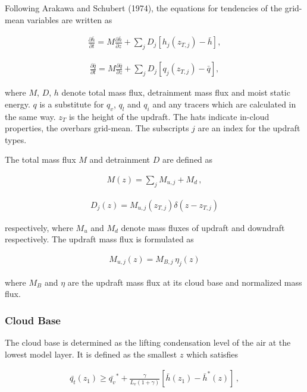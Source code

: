 Following Arakawa and Schubert (1974), the equations for tendencies of
the grid-mean variables are written as

\begin{eqnarray}
 \frac{\partial \bar{h}}{\partial t} = M \frac{\partial \bar{h}}{\partial z} + \sum_j D_j \left[ h_j(z_{T,j}) - \bar{h} \right],
\end{eqnarray}

\begin{eqnarray}
 \frac{\partial \bar{q}}{\partial t} = M\frac{\partial \bar{q}}{\partial z} + \sum_j D_j \left[ q_j(z_{T,j}) - \bar{q} \right],
\end{eqnarray}

where \(M\), \(D\), \(h\) denote total mass flux, detrainment mass flux
and moist static energy. \(q\) is a substitute for \(q_v\), \(q_l\) and
\(q_i\) and any tracers which are calculated in the same way. \(z_T\) is
the height of the updraft. The hats indicate in-cloud properties, the
overbars grid-mean. The subscripts \(j\) are an index for the updraft
types.

The total mass flux \(M\) and detrainment \(D\) are defined as

\begin{eqnarray}
M(z) = \sum_j M_{u,j} + M_d \, ,
\end{eqnarray}

\begin{eqnarray}
 D_j(z) = M_{u,j}(z_{T,j}) \delta (z-z_{T,j})
\end{eqnarray}

respectively, where \(M_u\) and \(M_d\) denote mass fluxes of updraft
and downdraft respectively. The updraft mass flux is formulated as

\begin{eqnarray}
 M_{u,j}(z) = M_{B,j} \, \eta_j(z)
\end{eqnarray}

where \(M_B\) and \(\eta\) are the updraft mass flux at its cloud base
and normalized mass flux.

\hypertarget{cloud-base}{%
\subsubsection{Cloud Base}\label{cloud-base}}

The cloud base is determined as the lifting condensation level of the
air at the lowest model layer. It is defined as the smallest \(z\) which
satisfies

\begin{eqnarray}
  \bar{q_t}(z_1) \geq \bar{q_v}^* + \frac{\gamma}{L_v(1+\gamma)} \left[\bar{h}(z_1)-\bar{h}^*(z) \right]\,,
\end{eqnarray}

